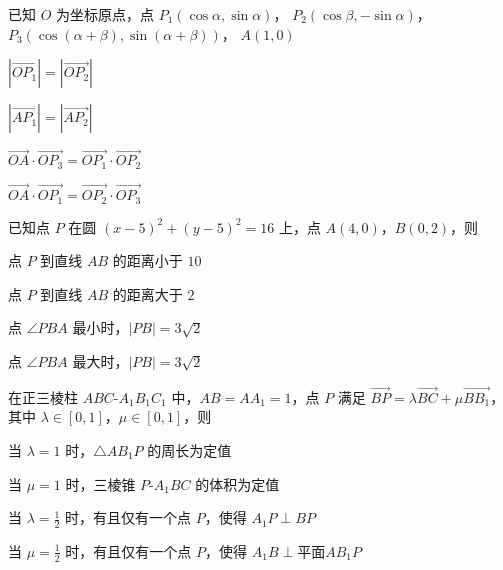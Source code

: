 \documentclass{exam-zh}
\begin{document}
\begin{question}
  已知 $O$ 为坐标原点，点
  $P_1(\cos\alpha,  \sin\alpha)$，
  $P_2(\cos\beta , -\sin\alpha)$，
  $P_3(\cos(\alpha + \beta),  \sin(\alpha + \beta))$，
  $A(1, 0)$ \paren
  \begin{choices}
    \item $|\overrightarrow{OP_1}| = |\overrightarrow{OP_2}|$
    \item $|\overrightarrow{AP_1}| = |\overrightarrow{AP_2}|$
    \item $\overrightarrow{OA} \cdot \overrightarrow{OP_3}
      = \overrightarrow{OP_1} \cdot \overrightarrow{OP_2}$
    \item $\overrightarrow{OA} \cdot \overrightarrow{OP_1}
      = \overrightarrow{OP_2} \cdot \overrightarrow{OP_3}$
  \end{choices}
\end{question}

\begin{question}
  已知点 $P$ 在圆 $(x - 5)^2 + (y - 5)^2 = 16$ 上，点 $A(4, 0)$，$B(0, 2)$，则 \paren
  \begin{choices}
    \item 点 $P$ 到直线 $AB$ 的距离小于 $10$
    \item 点 $P$ 到直线 $AB$ 的距离大于 $2$
    \item 点 $\angle PBA$ 最小时，$|PB| = 3 \sqrt{2}$
    \item 点 $\angle PBA$ 最大时，$|PB| = 3 \sqrt{2}$
  \end{choices}
\end{question}

\begin{question}
  在正三棱柱 $ABC$-$A_1 B_1 C_1$ 中，$AB = A A_1 = 1$，点 $P$ 满足
  $\overrightarrow{BP} = \lambda \overrightarrow{BC} + \mu \overrightarrow{BB_1}$，
  其中 $\lambda \in [0, 1]$，$\mu \in [0, 1]$，则 \paren
  \begin{choices}
    \item 当 $\lambda = 1$ 时，$\triangle A B_1 P$ 的周长为定值
    \item 当 $\mu = 1$ 时，三棱锥 $P$-$A_1 B C$ 的体积为定值
    \item 当 $\lambda = \frac{1}{2}$ 时，有且仅有一个点 $P$，使得 $A_1 P \perp BP$
    \item 当 $\mu = \frac{1}{2}$ 时，有且仅有一个点 $P$，使得 $A_1 B \perp \text{平面} A B_1 P$
  \end{choices}
\end{question}
\end{document}
